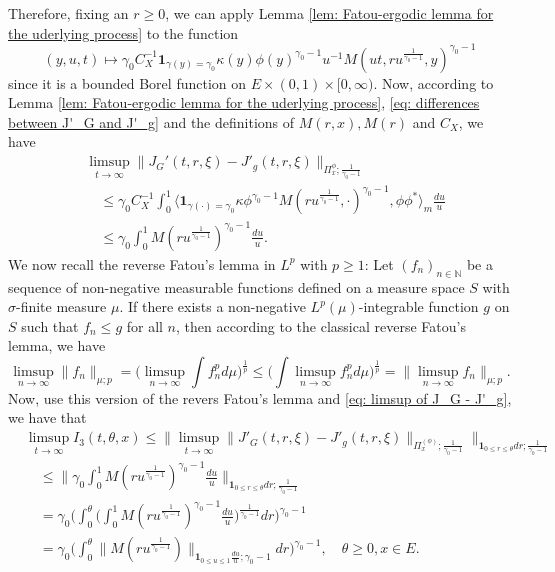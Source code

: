 \documentclass[12pt, a4paper]{amsart}
\theoremstyle{definition}
\numberwithin{equation}{section}
\begin{document}
	Therefore, fixing an $r\geq 0$, we can apply Lemma \ref{lem: Fatou-ergodic lemma for the uderlying process} to the function
\begin{equation}
	(y,u,t)
	\mapsto \gamma_0 C_X^{-1}\mathbf 1_{\gamma(y) = \gamma_0} \kappa(y)  \phi(y)^{\gamma_0 - 1}  u^{-1} M(ut,ru^{\frac{1}{\gamma_0 - 1}},y)^{\gamma_0 - 1}
\end{equation}
	since it is a bounded Borel function on $E\times (0,1) \times [0,\infty)$.
	Now, according to Lemma \ref{lem: Fatou-ergodic lemma for the uderlying process},  \eqref{eq: differences between J'_G and J'_g} and 
    the definitions of  
$M(r,x), M(r)$ and $C_X$, we have
\begin{equation}\label{eq: limsup of J_G - J'_g}\begin{split}
	&\limsup_{t\to \infty} \| J_G'(t,r,\xi) - J'_g(t,r,\xi) \|_{\Pi_x^{\phi};\frac{1}{\gamma_0 - 1}}
	\\&\quad\leq  \gamma_0 C_X^{-1} \int_0^1 \big\langle \mathbf 1_{\gamma(\cdot) = \gamma_0} \kappa \phi^{\gamma_0 - 1} M(ru^{\frac{1}{\gamma_0 - 1}},\cdot)^{\gamma_0 - 1}, \phi\phi^* \big\rangle_m \frac{du}{u}
	\\&\quad\leq  \gamma_0  \int_0^1  M(ru^{\frac{1}{\gamma_0 - 1}})^{\gamma_0 - 1} \frac{du}{u}.
\end{split}\end{equation}
	We now recall the reverse Fatou's lemma in $L^p$ with $p\geq 1$: Let $(f_n)_{n\in \mathbb N}$ be a sequence of non-negative measurable functions defined on a measure space $S$ with $\sigma$-finite measure $\mu$. If there exists a non-negative $L^p(\mu)$-integrable function $g$ on $S$ such that $f_n \leq g$ for all $n$, then according to the classical reverse Fatou's lemma, we have
\begin{equation}
	\limsup_{n\to \infty}\big\| f_n \big\|_{\mu;p}
	= \Big (   \limsup_{n\to \infty}  \int f^p_n d\mu        \Big)^{\frac{1}{p}}
	\leq  \Big (   \int \limsup_{n\to \infty} f^p_n d\mu        \Big)^{\frac{1}{p}}
	= \big\| \limsup_{n\to \infty} f_n \big\|_{\mu;p}.
\end{equation}
	Now, use this version of the revers Fatou's lemma and \eqref{eq: limsup of J_G - J'_g}, we have that
\begin{equation}\begin{split}
	&\limsup_{t\to \infty} I_3(t,\theta, x)
	\leq \big\| \limsup_{t\to \infty} \|    J'_G(t,r,\xi) - J'_g(t,r,\xi) \|_{\Pi_x^{(\phi)};\frac{1}{\gamma_0 - 1}} \big\|_{\mathbf 1_{0\leq r\leq \theta} dr;\frac{1}{\gamma_0 - 1}}
	\\&\quad\leq \Big\| \gamma_0  \int_0^1  M(ru^{\frac{1}{\gamma_0 - 1}})^{\gamma_0 - 1} \frac{du}{u} \Big\|_{\mathbf 1_{0\leq r\leq \theta} dr;\frac{1}{\gamma_0 - 1}}
	\\&\quad = \gamma_0 \bigg( \int_0^\theta \Big (   \int_0^1  M(ru^{\frac{1}{\gamma_0 - 1}})^{\gamma_0 - 1} \frac{du}{u}   \Big )^{\frac{1}{\gamma_0 - 1}} dr \bigg)^{\gamma_0 - 1}
	\\&\quad = \gamma_0 \Big(  \int_0^\theta  \| M(r u^{\frac{1}{\gamma_0 - 1}}) \|_{\mathbf 1_{0\leq u\leq 1}\frac{du}{u};\gamma_0 - 1}  dr\Big)^{\gamma_0 - 1},
	\quad \theta \geq 0, x\in E.
\end{split}\end{equation}
	
\end{document}
